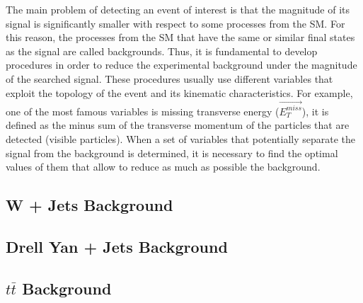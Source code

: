 The main problem of detecting an event of interest is that the magnitude of its signal is significantly smaller with respect to some processes from the SM. For this reason, the processes from the SM that have the same or similar final states as the signal are called backgrounds. Thus, it is fundamental to develop procedures in order to reduce the experimental background under the magnitude of the searched signal. These procedures usually use different variables that exploit the topology of the event and its kinematic characteristics. For example, one of the most famous variables is missing transverse energy ($\vec{E_T^{miss}}$), it is defined as the minus sum of the transverse momentum of the particles that are detected (visible particles). When a set of variables that potentially separate the signal from the background is determined, it is necessary to find the optimal values of them that allow to reduce as much as possible the background. 
 
 \subsection{W + Jets Background}
  
 \subsection{Drell Yan + Jets Background}
 
 \subsection{$t \bar{t}$ Background}
 
 